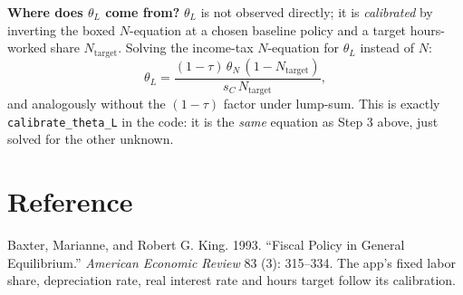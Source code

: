 \documentclass[11pt]{article}
\newcommand{\eq}[1]{\begin{equation}#1\end{equation}}
\begin{document}
\begin{notebox}
\textbf{Where does $\theta_L$ come from?} $\theta_L$ is not observed
directly; it is \emph{calibrated} by inverting the boxed $N$-equation at a
chosen baseline policy and a target hours-worked share $N_{\text{target}}$.
Solving the income-tax $N$-equation
for $\theta_L$ instead of $N$:
\eq{ \theta_L = \frac{(1-\tau)\,\theta_N\,(1-N_{\text{target}})}{s_C\,N_{\text{target}}}, }
and analogously without the $(1-\tau)$ factor under lump-sum. This is
exactly \texttt{calibrate\_theta\_L} in the code: it is the \emph{same}
equation as Step 3 above, just solved for the other unknown.
\end{notebox}

\section*{Reference}
\noindent Baxter, Marianne, and Robert G. King. 1993. ``Fiscal Policy in General Equilibrium.'' \textit{American Economic Review} 83 (3): 315--334.
The app's fixed labor share, depreciation rate, real interest rate and hours target follow its calibration.
\end{document}
